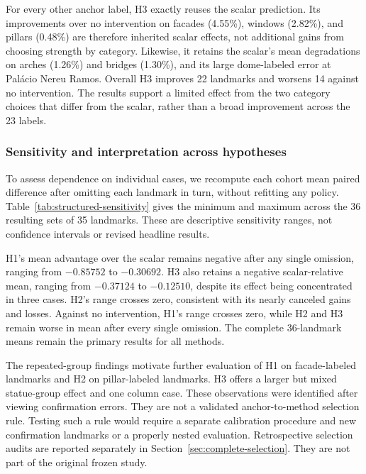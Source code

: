 For every other anchor label, H3 exactly reuses the scalar prediction. Its improvements over no intervention on facades (4.55\%), windows (2.82\%), and pillars (0.48\%) are therefore inherited scalar effects, not additional gains from choosing strength by category. Likewise, it retains the scalar's mean degradations on arches (1.26\%) and bridges (1.30\%), and its large dome-labeled error at Pal\'acio Nereu Ramos. Overall H3 improves 22 landmarks and worsens 14 against no intervention. The results support a limited effect from the two category choices that differ from the scalar, rather than a broad improvement across the 23 labels.

\subsubsection{Sensitivity and interpretation across hypotheses}
To assess dependence on individual cases, we recompute each cohort mean paired difference after omitting each landmark in turn, without refitting any policy. Table~\ref{tab:structured-sensitivity} gives the minimum and maximum across the 36 resulting sets of 35 landmarks. These are descriptive sensitivity ranges, not confidence intervals or revised headline results.

H1's mean advantage over the scalar remains negative after any single omission, ranging from $-0.85752$ to $-0.30692$. H3 also retains a negative scalar-relative mean, ranging from $-0.37124$ to $-0.12510$, despite its effect being concentrated in three cases. H2's range crosses zero, consistent with its nearly canceled gains and losses. Against no intervention, H1's range crosses zero, while H2 and H3 remain worse in mean after every single omission. The complete 36-landmark means remain the primary results for all methods.

The repeated-group findings motivate further evaluation of H1 on facade-labeled landmarks and H2 on pillar-labeled landmarks. H3 offers a larger but mixed statue-group effect and one column case. These observations were identified after viewing confirmation errors. They are not a validated anchor-to-method selection rule. Testing such a rule would require a separate calibration procedure and new confirmation landmarks or a properly nested evaluation. Retrospective selection audits are reported separately in Section~\ref{sec:complete-selection}. They are not part of the original frozen study.

\begin{table}[p]
\caption{Mean paired error ranges after omitting each confirmation landmark in turn, with 35 landmarks per calculation and the policy fixed. Negative favors the method. These are sensitivity ranges, not confidence intervals.}
\label{tab:structured-sensitivity}
\centering

\end{table}


